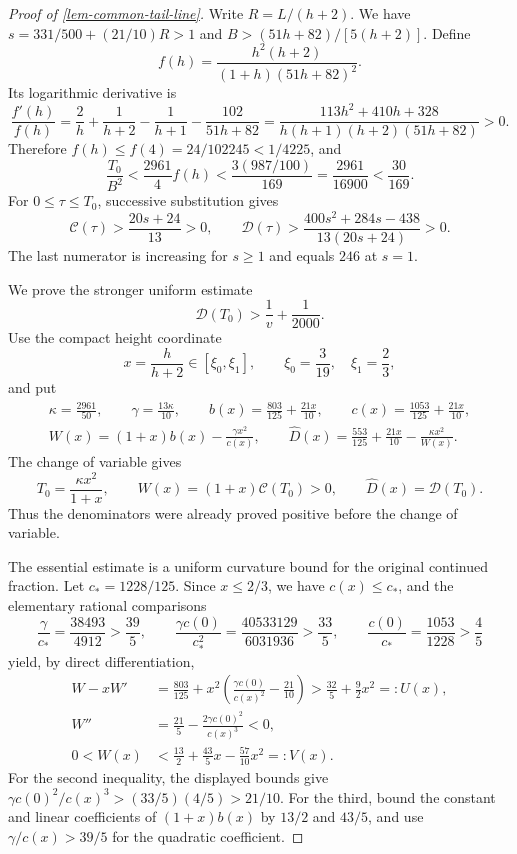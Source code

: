 \documentclass[11pt,a4paper]{article}
\theoremstyle{proofmanuscript}
\begin{document}
\begin{proof}[Proof of \ref{lem-common-tail-line}]

Write \(R=L/(h+2)\). We have \(s=331/500+(21/10)R>1\) and \(B>(51h+82)/[5(h+2)]\). Define \[
f(h)=\frac{h^2(h+2)}{(1+h)(51h+82)^2}.
\] Its logarithmic derivative is \[
\frac{f'(h)}{f(h)}
=\frac2h+\frac1{h+2}-\frac1{h+1}-\frac{102}{51h+82}
=\frac{113h^2+410h+328}{h(h+1)(h+2)(51h+82)}>0.
\] Therefore \(f(h)\le f(4)=24/102245<1/4225\), and \[
\frac{T_0}{B^2}<\frac{2961}{4}f(h)
<\frac{3(987/100)}{169}
=\frac{2961}{16900}<\frac{30}{169}.
\] For \(0\le\tau\le T_0\), successive substitution gives \[
\mathcal C(\tau)>\frac{20s+24}{13}>0,\qquad
\mathcal D(\tau)>\frac{400s^2+284s-438}{13(20s+24)}>0.
\] The last numerator is increasing for \(s\ge1\) and equals \(246\) at \(s=1\).

We prove the stronger uniform estimate \[
\mathcal D(T_0)>\frac1v+\frac1{2000}.
\] Use the compact height coordinate \[
x=\frac h{h+2}\in[\xi_0,\xi_1],\qquad
\xi_0=\frac3{19},\quad \xi_1=\frac23,
\] and put \[
\begin{gathered}
\kappa=\frac{2961}{50},\qquad \gamma=\frac{13\kappa}{10},\qquad
b(x)=\frac{803}{125}+\frac{21x}{10},\qquad
c(x)=\frac{1053}{125}+\frac{21x}{10},\\
W(x)=(1+x)b(x)-\frac{\gamma x^2}{c(x)},\qquad
\widehat D(x)=\frac{553}{125}+\frac{21x}{10}-\frac{\kappa x^2}{W(x)}.
\end{gathered}
\] The change of variable gives \[
T_0=\frac{\kappa x^2}{1+x},\qquad
W(x)=(1+x)\mathcal C(T_0)>0,\qquad
\widehat D(x)=\mathcal D(T_0).
\] Thus the denominators were already proved positive before the change of variable.

The essential estimate is a uniform curvature bound for the original continued fraction. Let \(c_*=1228/125\). Since \(x\le2/3\), we have \(c(x)\le c_*\), and the elementary rational comparisons \[
\frac\gamma{c_*}=\frac{38493}{4912}>\frac{39}{5},\qquad
\frac{\gamma c(0)}{c_*^2}=\frac{40533129}{6031936}>\frac{33}{5},\qquad
\frac{c(0)}{c_*}=\frac{1053}{1228}>\frac45
\] yield, by direct differentiation, \[
\begin{aligned}
W-xW'&=\frac{803}{125}
+x^2\left(\frac{\gamma c(0)}{c(x)^2}-\frac{21}{10}\right)
>\frac{32}{5}+\frac92x^2=:U(x),\\
W''&=\frac{21}{5}-\frac{2\gamma c(0)^2}{c(x)^3}<0,\\
0<W(x)&<\frac{13}{2}+\frac{43}{5}x-\frac{57}{10}x^2=:V(x).
\end{aligned}
\] For the second inequality, the displayed bounds give \(\gamma c(0)^2/c(x)^3>(33/5)(4/5)>21/10\). For the third, bound the constant and linear coefficients of \((1+x)b(x)\) by \(13/2\) and \(43/5\), and use \(\gamma/c(x)>39/5\) for the quadratic coefficient.


\end{proof}
\end{document}
